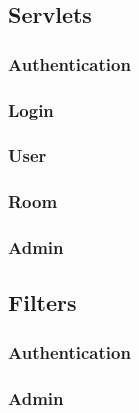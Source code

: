 \subsection{Servlets}\label{subsec:03_impl_servlets}

\subsubsection{Authentication}\label{subsubsec:03_impl_servlets_auth}

\subsubsection{Login}\label{subsubsec:03_impl_servlets_login}

\subsubsection{User}\label{subsubsec:03_impl_servlets_user}

\subsubsection{Room}\label{subsubsec:03_impl_servlets_room}

\subsubsection{Admin}\label{subsubsec:03_impl_servlets_admin}


\subsection{Filters}\label{subsec:03_impl_filters}

\subsubsection{Authentication}\label{subsubsec:03_impl_filters_auth}

\subsubsection{Admin}\label{subsubsec:03_impl_filters_admin}
